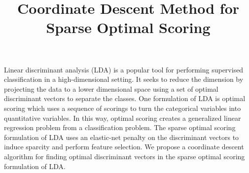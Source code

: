 \documentclass[12pt, reqno]{amsart}
\theoremstyle{definition}
\theoremstyle{remark}
\begin{document}
\title[]{Coordinate Descent Method for Sparse Optimal Scoring}
\maketitle

Linear discriminant analysis (LDA) is a popular tool for performing supervised classification in a high-dimensional setting. It seeks to reduce the dimension by projecting the data to a lower dimensional space using a set of optimal discriminant vectors to separate the classes. One formulation of LDA is optimal scoring which uses a sequence of scorings to turn the categorical variables into quantitative variables. In this way, optimal scoring creates a generalized linear regression problem from a classification problem. The sparse optimal scoring formulation of LDA uses an elastic-net penalty on the discriminant vectors to induce sparcity and perform feature selection. We propose a coordinate descent algorithm for finding optimal discriminant vectors in the sparse optimal scoring formulation of LDA. 
\end{document}
